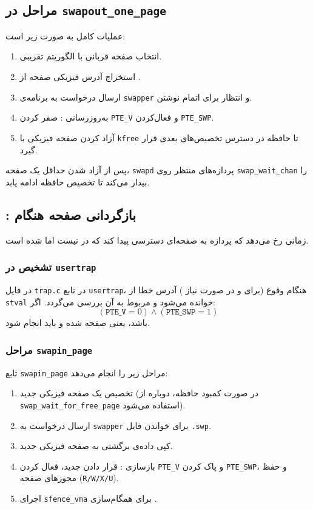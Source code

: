 \documentclass[12pt]{article}
\begin{document}
\subsection{مراحل  در \texttt{swapout\_one\_page}}
عملیات کامل  به صورت زیر است:
\begin{enumerate}
  \item انتخاب صفحه قربانی با الگوریتم  تقریبی.
  \item استخراج آدرس فیزیکی صفحه از .
  \item ارسال درخواست  به برنامه‌ی \texttt{swapper} و انتظار برای اتمام نوشتن.
  \item به‌روزرسانی : صفر کردن \texttt{PTE\_V} و فعال‌کردن \texttt{PTE\_SWP}.
  \item آزاد کردن صفحه فیزیکی با \texttt{kfree} تا حافظه در دسترس تخصیص‌های بعدی قرار گیرد.
\end{enumerate}

پس از آزاد شدن حداقل یک صفحه، \texttt{swapd} پردازه‌های منتظر روی \texttt{swap\_wait\_chan} را بیدار می‌کند تا تخصیص حافظه ادامه یابد.

\subsection{: بازگردانی صفحه هنگام }
 زمانی رخ می‌دهد که پردازه به صفحه‌ای دسترسی پیدا کند که در  نیست اما  شده است.

\subsubsection{تشخیص در \texttt{usertrap}}
در فایل \texttt{trap.c} در تابع \texttt{usertrap}، هنگام وقوع  (برای  و در صورت نیاز ) آدرس خطا از \texttt{stval} خوانده می‌شود و  مربوط به آن  بررسی می‌گردد. اگر:
\[
(\texttt{PTE\_V} = 0) \land (\texttt{PTE\_SWP} = 1)
\]
باشد، یعنی صفحه  شده و باید  انجام شود.

\subsubsection{مراحل \texttt{swapin\_page}}
تابع \texttt{swapin\_page} مراحل زیر را انجام می‌دهد:
\begin{enumerate}
  \item تخصیص یک صفحه فیزیکی جدید (در صورت کمبود حافظه، دوباره از \texttt{swap\_wait\_for\_free\_page} استفاده می‌شود).
  \item ارسال درخواست  به \texttt{swapper} برای خواندن فایل \texttt{.swp}.
  \item کپی داده‌ی برگشتی به صفحه فیزیکی جدید.
  \item بازسازی : قرار دادن  جدید، فعال کردن \texttt{PTE\_V} و پاک کردن \texttt{PTE\_SWP}، و حفظ مجوزهای صفحه (\texttt{R/W/X/U}).
  \item اجرای \texttt{sfence\_vma} برای همگام‌سازی .
\end{enumerate}
\end{document}
